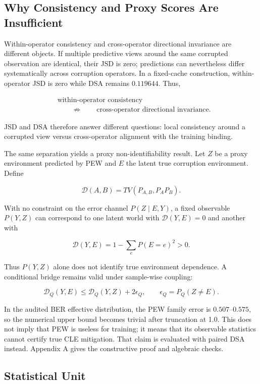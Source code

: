 \subsection{Why Consistency and Proxy Scores Are Insufficient}

Within-operator consistency and cross-operator directional invariance are different objects. If multiple predictive views around the same corrupted observation are identical, their JSD is zero; predictions can nevertheless differ systematically across corruption operators. In a fixed-cache construction, within-operator JSD is zero while DSA remains \(0.119644\). Thus,

\[
\begin{aligned}
&\text{within-operator consistency}\\
&\qquad\not\Rightarrow\qquad
\text{cross-operator directional invariance}.
\end{aligned}
\]

JSD and DSA therefore answer different questions: local consistency around a corrupted view versus cross-operator alignment with the training binding.

The same separation yields a proxy non-identifiability result. Let \(Z\) be a proxy environment predicted by PEW and \(E\) the latent true corruption environment. Define

\[
\mathcal D(A,B)=TV(P_{A,B},P_AP_B).
\]

With no constraint on the error channel \(P(Z\mid E,Y)\), a fixed observable \(P(Y,Z)\) can correspond to one latent world with \(\mathcal D(Y,E)=0\) and another with

\[
\mathcal D(Y,E)=1-\sum_eP(E=e)^2>0.
\]

Thus \(P(Y,Z)\) alone does not identify true environment dependence. A conditional bridge remains valid under sample-wise coupling:

\[
\mathcal D_Q(Y,E)\le
\mathcal D_Q(Y,Z)+2\epsilon_Q,
\qquad
\epsilon_Q=P_Q(Z\neq E).
\]

In the audited BER effective distribution, the PEW family error is \(0.507\)--\(0.575\), so the numerical upper bound becomes trivial after truncation at 1.0. This does not imply that PEW is useless for training; it means that its observable statistics cannot certify true CLE mitigation. That claim is evaluated with paired DSA instead. Appendix A gives the constructive proof and algebraic checks.

\subsection{Statistical Unit}

